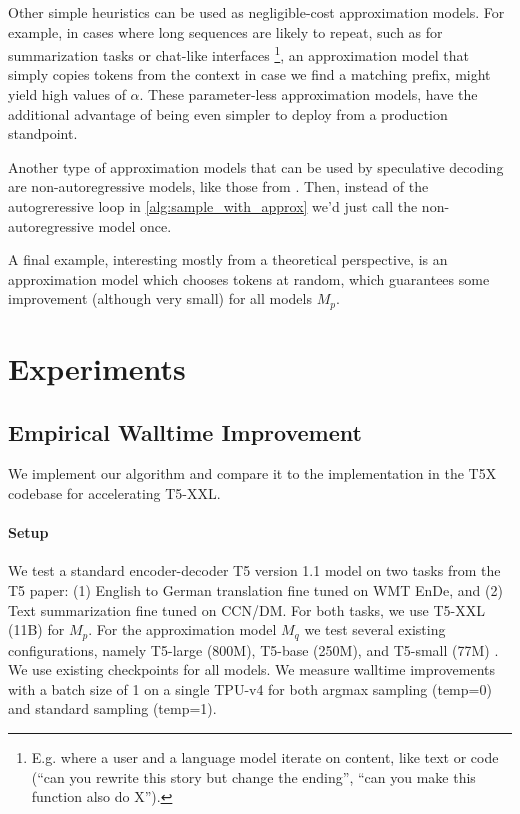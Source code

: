 Other simple heuristics can be used as negligible-cost approximation models. For example, in cases where long sequences are likely to repeat, such as for summarization tasks or chat-like interfaces \footnote{E.g. where a user and a language model iterate on content, like text or code (``can you rewrite this story but change the ending'', ``can you make this function also do X'').}, an approximation model that simply copies tokens from the context in case we find a matching prefix, might yield high values of $\alpha$.
These parameter-less approximation models, have the additional advantage of being even simpler to deploy from a production standpoint.

Another type of approximation models that can be used by speculative decoding are non-autoregressive models, like those from \citep{Blockwise_Parallel_Decoding}. Then, instead of the autogreressive loop in \ref{alg:sample_with_approx} we'd just call the non-autoregressive model once.

A final example, interesting mostly from a theoretical perspective, is an approximation model which chooses tokens at random, which guarantees some improvement (although very small) for all models $M_p$.

\section{Experiments}
\label{sec:experiments}

\subsection{Empirical Walltime Improvement}
\label{sec:empirical-t5-time}

We implement our algorithm and compare it to the implementation in the T5X codebase for accelerating T5-XXL.

\paragraph{Setup} We test a standard encoder-decoder T5 version 1.1 model \citep{t5} on two tasks from the T5 paper: (1) English to German translation fine tuned on WMT EnDe, and (2) Text summarization fine tuned on CCN/DM. For both tasks, we use T5-XXL (11B) for $M_p$. For the approximation model $M_q$ we test several existing configurations, namely T5-large (800M), T5-base (250M), and T5-small (77M) \citep{t5}. We use existing checkpoints for all models. We measure walltime improvements with a batch size of 1 on a single TPU-v4 for both argmax sampling (temp=0) and standard sampling (temp=1).


